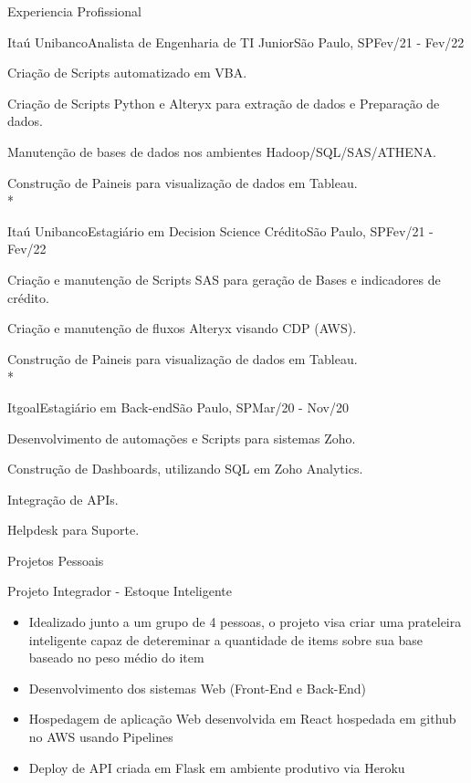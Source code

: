 \documentclass{article}
\newlength{\tabin}
\newlength{\secsep}
\newcommand{\lineunder}{\vspace*{-8pt} \\ \hspace*{-6pt} \hrulefill \\ \vspace*{-15pt}}
\newenvironment{tabbedsection}[1]{
  \begin{list}{}{
      \setlength{\itemsep}{0pt}
      \setlength{\labelsep}{0pt}
      \setlength{\labelwidth}{0pt}
      \setlength{\leftmargin}{\tabin}
      \setlength{\rightmargin}{\tabin}
      \setlength{\listparindent}{0pt}
      \setlength{\parsep}{0pt}
      \setlength{\parskip}{0pt}
      \setlength{\partopsep}{0pt}
      \setlength{\topsep}{#1}
    }
  \item[]
}{\end{list}}
\newenvironment{resume_section}[1]{
  \filbreak
  \vspace{2\secsep}
  \textsc{\large#1}
  \lineunder
  \begin{tabbedsection}{\secsep}
}{\end{tabbedsection}}
\newenvironment{resume_subsection}[2][]{
  \textbf{#2} \hfill {\footnotesize #1} \hspace{2em}
  \begin{tabbedsection}{0.5\secsep}
}{\end{tabbedsection}}
\newenvironment{subitems}{
  \renewcommand{\labelitemi}{-}
  \begin{itemize}
      \setlength{\labelsep}{1em}
}{\end{itemize}}
\newenvironment{resume_employer}[4]{
  \vspace{\secsep}
  \textbf{#1} \\ 
  \indent {\small #2} \hfill {\footnotesize#3 (#4)}
  \begin{tabbedsection}{0pt}
  \begin{subitems}
}{\end{subitems}\end{tabbedsection}}
\begin{document}
\begin{resume_section}{Experiencia Profissional}
  \begin{resume_employer}{Itaú Unibanco}{Analista de Engenharia de TI Junior}{São Paulo, SP}{Fev/21 - Fev/22}
    \item Criação de Scripts automatizado em VBA. 
    \item Criação de Scripts Python e Alteryx para extração de dados e Preparação de dados.
    \item Manutenção de bases de dados nos ambientes Hadoop/SQL/SAS/ATHENA.
    \item Construção de Paineis para visualização de dados em Tableau.
    \\*
  \end{resume_employer}
  
  \begin{resume_employer}{Itaú Unibanco}{Estagiário em Decision Science Crédito}{São Paulo, SP}{Fev/21 - Fev/22}
    \item Criação e manutenção de Scripts SAS para geração de Bases e indicadores de crédito.
    \item Criação e manutenção de fluxos Alteryx visando CDP (AWS).
    \item Construção de Paineis para visualização de dados em Tableau.
    \\*
  \end{resume_employer}
  
  \begin{resume_employer}{Itgoal}{Estagiário em Back-end}{São Paulo, SP}{Mar/20 - Nov/20}
    \item	Desenvolvimento de automações e Scripts para sistemas Zoho.
    \item	Construção de Dashboards, utilizando SQL em Zoho Analytics.
    \item	Integração de APIs.
    \item	Helpdesk para Suporte.
  \end{resume_employer}
\end{resume_section}


\begin{resume_section}{Projetos Pessoais}
  \begin{resume_subsection}[(Julho-2022)]{Projeto Integrador - Estoque Inteligente}
    \begin{subitems}
      \item Idealizado junto a um grupo de 4 pessoas, o projeto visa criar uma prateleira inteligente capaz de detereminar a quantidade de items sobre sua base baseado no peso médio do item
      \item Desenvolvimento dos sistemas Web (Front-End e Back-End)
      \item Hospedagem de aplicação Web desenvolvida em React hospedada em github no AWS usando Pipelines
      \item Deploy de API criada em Flask em ambiente produtivo via Heroku
    \end{subitems}
  \end{resume_subsection}
\end{resume_section}
\end{document}
